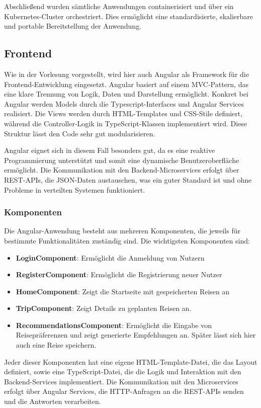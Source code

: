 Abschließend wurden sämtliche Anwendungen containerisiert und über ein Kubernetes-Cluster orchestriert. Dies ermöglicht eine standardisierte, skalierbare und portable Bereitstellung der Anwendung.


\subsection{Frontend}

Wie in der Vorlesung vorgestellt, wird hier auch Angular als Framework für die Frontend-Entwicklung eingesetzt. Angular basiert auf einem MVC-Pattern, das eine klare Trennung von Logik, Daten und Darstellung ermöglicht.
Konkret bei Angular werden Models durch die Typescript-Interfaces und Angular Services realisiert. Die Views werden durch HTML-Templates und CSS-Stile definiert, während die Controller-Logik in TypeScript-Klassen implementiert wird. Diese Struktur lässt den Code sehr gut modularisieren.

Angular eignet sich in diesem Fall besonders gut, da es eine reaktive Programmierung unterstützt und somit eine dynamische Benutzeroberfläche ermöglicht. Die Kommunikation mit den Backend-Microservices erfolgt über REST-APIs, die JSON-Daten austauschen, was ein guter Standard ist und ohne Probleme in verteilten Systemen funktioniert.

\subsubsection{Komponenten}
Die Angular-Anwendung besteht aus mehreren Komponenten, die jeweils für bestimmte Funktionalitäten zuständig sind. Die wichtigsten Komponenten sind:

\begin{itemize}
  \item \textbf{LoginComponent}: Ermöglicht die Anmeldung von Nutzern
  \item \textbf{RegisterComponent}: Ermöglicht die Registrierung neuer Nutzer
  \item \textbf{HomeComponent}: Zeigt die Startseite mit gespeicherten Reisen an
  \item \textbf{TripComponent}: Zeigt Details zu geplanten Reisen an.
  \item \textbf{RecommendationsComponent}: Ermöglicht die Eingabe von Reisepräferenzen und zeigt generierte Empfehlungen an. Später lässt sich hier auch eine Reise speichern.
\end{itemize}

Jeder dieser Komponenten hat eine eigene HTML-Template-Datei, die das Layout definiert, sowie eine TypeScript-Datei, die die Logik und Interaktion mit den Backend-Services implementiert. Die Kommunikation mit den Microservices erfolgt über Angular Services, die HTTP-Anfragen an die REST-APIs senden und die Antworten verarbeiten.

